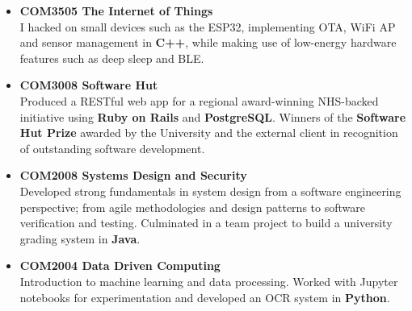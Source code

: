 \documentclass[11pt,a4paper,sans]{moderncv}
\begin{document}
{\begin{itemize}
    \item \textbf{COM3505 The Internet of Things}\\
          I hacked on small devices such as the ESP32, implementing OTA, WiFi AP and sensor management in \textbf{C++}, while making use of low-energy hardware features such as deep sleep and BLE.
    \item \textbf{COM3008 Software Hut}\\
          Produced a RESTful web app for a regional award-winning NHS-backed initiative using \textbf{Ruby on Rails} and \textbf{PostgreSQL}. Winners of the \textbf{Software Hut Prize} awarded by the University and the external client in recognition of outstanding software development.
    \item \textbf{COM2008 Systems Design and Security}\\
          Developed strong fundamentals in system design from a software engineering perspective; from agile methodologies and design patterns to software verification and testing. Culminated in a team project to build a university grading system in \textbf{Java}.
    \item \textbf{COM2004 Data Driven Computing}\\
          Introduction to machine learning and data processing. Worked with Jupyter notebooks for experimentation and developed an OCR system in \textbf{Python}.
\end{itemize}}

\pagebreak

\end{document}
